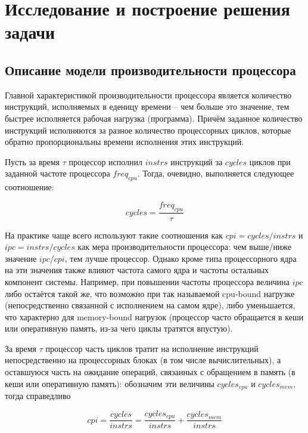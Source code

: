 \section{Исследование и построение решения задачи}
\label{sec:Section3} 

\subsection{Описание модели производительности процессора}

    Главной характеристикой производительности процессора является количество инструкций,
    исполняемых в еденицу времени -- чем больше это значение, тем быстрее исполняется рабочая
    нагрузка (программа). Причём заданное количество инструкций исполняются за разное количество
    процессорных циклов, которые обратно пропорциональны времени исполнения этих инструкций.

    Пусть за время $\tau$ процессор исполнил $instrs$ инструкций за $cycles$ циклов при заданной
    частоте процессора $freq_{cpu}$. Тогда, очевидно, выполняется следующее соотношение:

    \begin{equation} \label{cycles_base}
        cycles = \frac{freq_{cpu}}{\tau}
    \end{equation}

    На практике чаще всего используют такие соотношения как $cpi = cycles / instrs$ и
    $ipc = instrs / cycles$ как мера производительности процессора: чем выше/ниже значение
    $ipc$/$cpi$, тем лучше процессор. Однако кроме типа процессорного ядра на эти значения также
    влияют частота самого ядра и частоты остальных компонент системы. Например, при повышении частоты
    процессора величина $ipc$ либо остаётся такой же, что возможно при так называемой cpu-bound
    нагрузке (непосредственно связанной с исполнением на самом ядре), либо уменьшается, что
    характерно для memory-bound нагрузок (процессор часто обращается в кеши или оперативную память,
    из-за чего циклы тратятся впустую).

    За время $\tau$ процессор часть циклов тратит на исполнение инструкций непосредственно на
    процессорных блоках (в том числе вычислительных), а оставшуюся часть на ожидание операций, связанных
    с обращением в память (в кеши или оперативную память): обозначим эти величины $cycles_{cpu}$ и
    $cycles_{mem}$, тогда справедливо

    \begin{equation}
        cpi = \frac{cycles}{instrs} = \frac{cycles_{cpu}}{instrs} + \frac{cycles_{mem}}{instrs}
    \end{equation}

